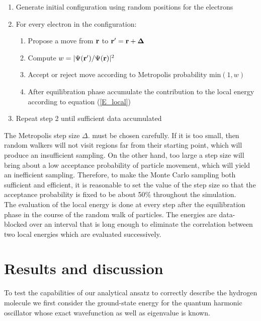 \documentclass{article}
\begin{document}
  \begin{enumerate}
    \item Generate initial configuration using random positions for the electrons
    \item For every electron in the configuration:
    \begin{enumerate}
     \item Propose a move from ${\bf r}$ to  ${\bf r}^\prime=\bf r +\Delta$ 
     \item Compute  $w=\vert\Psi({\bf r}^\prime)/\Psi({\bf r})\vert^2$
     \item Accept or reject move according to Metropolis probability $\mathrm{min}(1,w)$
     \item After equilibration phase accumulate the contribution to the local energy according to equation (\ref{E_local})
    \end{enumerate}
    \item Repeat step 2 until sufficient data accumulated 
  \end{enumerate}

The Metropolis step size $\Delta$. must be chosen carefully. If it is too small, then random walkers will not visit regions far from their starting point, which will produce an insufficient sampling. On the other hand, too large a step size will bring about a low acceptance probability of particle movement, which will yield an inefficient sampling. Therefore, to make the Monte Carlo sampling both sufficient and efficient, it is reasonable to set the value of the step size so that the acceptance probability is fixed to be about 50\% throughout the simulation.\\

The evaluation of the local energy is done at every step after the equilibration phase in the course of the random walk of particles. The energies are data-blocked over an interval that is long enough to eliminate the correlation between two local energies which are evaluated successively.


\section{Results and discussion}
To test the capabilities of our analytical ansatz to correctly describe the hydrogen molecule we first consider the ground-state energy for the quantum harmonic oscillator whose exact wavefunction as well as eigenvalue is known.
\end{document}
